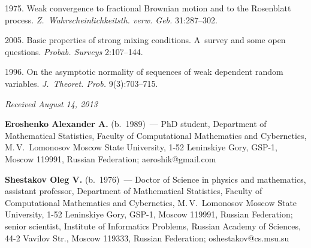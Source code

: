 \begin{multicols}{2}
{{\begin{thebibliography}{99}
1975. Weak convergence to fractional Brownian motion and to the Rosenblatt process.
\textit{Z.~Wahrscheinlichkeitsth. verw. Geb.} 31:287--302.

2005. Basic properties of strong mixing conditions. A~survey and some open questions.
\textit{Probab. Surveys} 2:107--144.

1996. On the asymptotic normality of sequences of weak dependent random variables.
\textit{J.~Theoret. Prob.} 9(3):703--715.
\end{thebibliography}
} }


\end{multicols}

\vspace*{-6pt}

\hfill{\small\textit{Received August 14, 2013}}

\vspace*{-18pt}

\Contr

\noindent
\textbf{Eroshenko Alexander A.} (b.\ 1989)~--- PhD student, Department of Mathematical Statistics, Faculty of Computational
Mathematics and Cybernetics, M.\,V.~Lomonosov
Moscow State University, 1-52 Leninskiye Gory, GSP-1, Moscow 119991, Russian Federation; 
aeroshik@gmail.com 

\vspace*{2pt}

\noindent
\textbf{Shestakov Oleg V.} (b.\ 1976)~--- Doctor of Science in physics and 
mathematics, assistant professor, Department of Mathematical Statistics, Faculty of Computational
Mathematics and Cybernetics, M.\,V.~Lomonosov
Moscow State University, 
1-52 Leninskiye Gory, GSP-1, Moscow 119991, Russian Federation; senior scientist, Institute of Informatics Problems, Russian Academy of
Sciences, 44-2 Vavilov Str., Moscow 119333, Russian Federation; oshestakov@cs.msu.su



 \label{end\stat}
 
\renewcommand{\bibname}{\protect\rm Литература}  
  